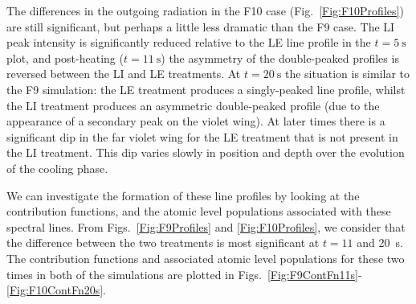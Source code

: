 The differences in the outgoing radiation in the F10 case (Fig.~\ref{Fig:F10Profiles}) are still significant, but perhaps a little less dramatic than the F9 case.
The LI peak intensity is significantly reduced relative to the LE line profile in the $t=\SI{5}{\second}$ plot, and post-heating ($t=\SI{11}{\second}$) the asymmetry of the double-peaked profiles is reversed between the LI and LE treatments.
At $t=\SI{20}{\second}$ the situation is similar to the F9 simulation: the LE treatment produces a singly-peaked line profile, whilst the LI treatment produces an asymmetric double-peaked profile (due to the appearance of a secondary peak on the violet wing).
At later times there is a significant dip in the far violet wing for the LE treatment that is not present in the LI treatment.
This dip varies slowly in position and depth over the evolution of the cooling phase.

We can investigate the formation of these line profiles by looking at the contribution functions, and the atomic level populations associated with these spectral lines.
From Figs.~\ref{Fig:F9Profiles} and \ref{Fig:F10Profiles}, we consider that the difference between the two treatments is most significant at $t=11$ and \SI{20}{\second}.
The contribution functions and associated atomic level populations for these two times in both of the simulations are plotted in Figs.~\ref{Fig:F9ContFn11s}-\ref{Fig:F10ContFn20s}.




